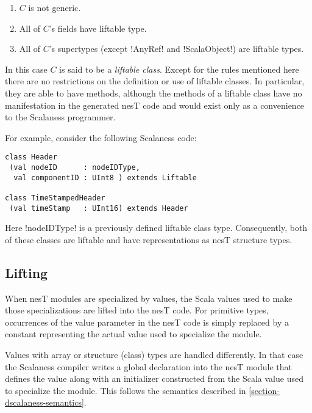 \begin{enumerate}
\item $C$ is not generic.
\item All of $C$'s fields have liftable type.
\item All of $C$'s supertypes (except !AnyRef! and !ScalaObject!) are liftable types.
\end{enumerate}

In this case $C$ is said to be a \textit{liftable class}. Except for the rules mentioned here
there are no restrictions on the definition or use of liftable classes. In particular, they are
able to have methods, although the methods of a liftable class have no manifestation in the
generated nesT code and would exist only as a convenience to the Scalaness programmer.

For example, consider the following Scalaness code:

\singlespace
\vspace{1.0ex}
\begin{lstlisting}[language=scalaness]
class Header
 (val nodeID      : nodeIDType,
  val componentID : UInt8 ) extends Liftable

class TimeStampedHeader
 (val timeStamp   : UInt16) extends Header
\end{lstlisting}
\vspace{1.0ex}
\primaryspacing

Here !nodeIDType! is a previously defined liftable class type. Consequently, both of these
classes are liftable and have representations as nesT structure types.


\subsection{Lifting}
\label{section-lifting}

When nesT modules are specialized by values, the Scala values used to make those specializations
are lifted into the nesT code. For primitive types, occurrences of the value parameter in the
nesT code is simply replaced by a constant representing the actual value used to specialize the
module.

Values with array or structure (class) types are handled differently. In that case the Scalaness
compiler writes a global declaration into the nesT module that defines the value along with an
initializer constructed from the Scala value used to specialize the module. This follows the
semantics described in \autoref{section-dscalaness-semantics}.

